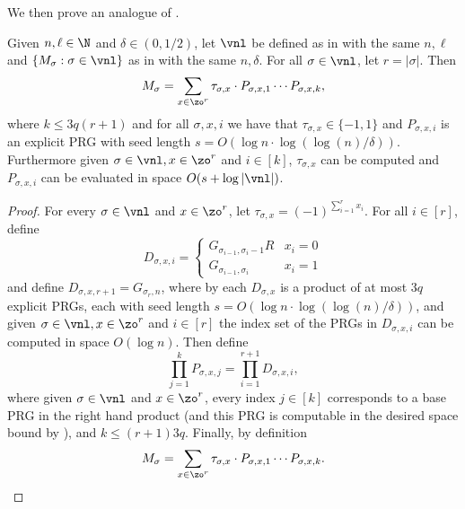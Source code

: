 \documentclass{toc}
\begin{document}
We then prove an analogue of .
\begin{corollary}\label{cor:MstructCycle}
Given $n,\ell \in  \N$ and $\delta \in (0,1/2)$, let $\vnl$ be defined as in  with the same $n,\ell$ and $\{M_\sigma:\sigma\in\vnl\}$ as in  with the same $n,\delta$. For all $\sigma\in \vnl$, let $r=|\sigma|$. Then
\[M_\sigma=\sum_{x\in \zo^r}\tau_{\sigma,x}\cdot P_{\sigma,x,1}\cdots P_{\sigma,x,k},\]
where $k\leq 3q(r+1)$ and for all $\sigma,x,i$ we have that $\tau_{\sigma,x}\in \{-1,1\}$ and $P_{\sigma,x,i}$ is an explicit PRG with seed length $s=O(\log n\cdot\log(\log(n)/\delta))$.
Furthermore given $\sigma\in \vnl,x\in \zo^r$ and $i\in [k]$, $\tau_{\sigma,x}$ can be computed and $P_{\sigma,x,i}$ can be evaluated in space $O(s+\log|\vnl|)$.
\end{corollary}
\begin{proof}
For every $\sigma\in \vnl$ and $x\in \zo^{r}$, let $\tau_{\sigma,x}=(-1)^{\sum_{i=1}^{r}x_i}$. 
For all $i\in[r]$, define %
\[D_{\sigma,x,i} = \begin{cases}
G_{\sigma_{i-1},\sigma_i-1}R & x_i=0\\
G_{\sigma_{i-1},\sigma_i} & x_i=1
\end{cases}\]
and define $D_{\sigma,x,r+1}=G_{\sigma_{r},n}$, where by  each $D_{\sigma,x}$ is a product of at most $3q$ explicit PRGs, each with seed length $s=O(\log n\cdot\log(\log(n)/\delta))$, and given $\sigma\in \vnl,x\in \zo^r$ and $i\in[r]$ the index set of the PRGs in $D_{\sigma,x,i}$ can be computed in space $O(\log n)$. Then define %
$$\prod_{j=1}^kP_{\sigma,x,j}=\prod_{i=1}^{r+1}D_{\sigma,x,i},$$ 
where given $\sigma\in \vnl$ and $x\in \zo^r$, every index $j\in[k]$ corresponds to a base PRG in the right hand product (and this PRG is computable in the desired space bound by ), and $k\leq (r+1)3q$. Finally, by definition
\[M_\sigma=\sum_{x\in \zo^r}\tau_{\sigma,x}\cdot P_{\sigma,x,1}\cdots P_{\sigma,x,k}.\qedhere\]
\end{proof}
\end{document}
